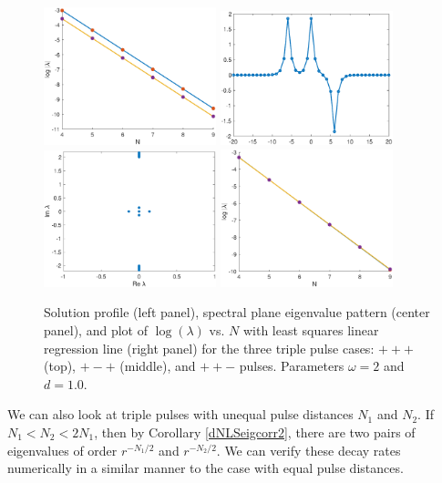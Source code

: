 \documentclass[12pt]{article}
\begin{document}
\begin{figure}[H]
\includegraphics[width=5cm]{dnlsPMPdecay.eps}
\includegraphics[width=5cm]{dnlsPPM.eps}
\includegraphics[width=5cm]{dnlsPPMeig.eps}
\includegraphics[width=5cm]{dnlsPPMdecay.eps}
\caption{Solution profile (left panel), spectral plane eigenvalue pattern (center panel), and plot of $\log(\lambda)$ vs. $N$ with least squares linear regression line (right panel) for the three triple pulse cases: $+++$ (top), $+-+$ (middle), and $++-$ pulses. Parameters $\omega = 2$ and $d = 1.0$.}
\label{fig:eigendecay2}
\end{figure}

We can also look at triple pulses with unequal pulse distances $N_1$ and $N_2$. If $N_1 < N_2 < 2 N_1$, then by Corollary \ref{dNLSeigcorr2}, there are two pairs of eigenvalues of order $r^{-N_1/2}$ and $r^{-N_2/2}$. We can verify these decay rates numerically in a similar manner to the case with equal pulse distances.
\end{document}
